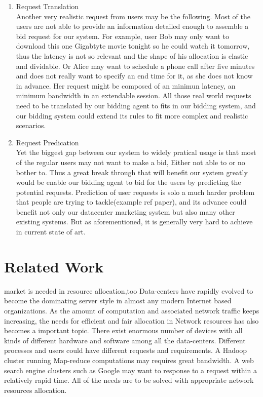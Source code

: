 \documentclass[a4paper,11pt,twocolumn]{article}
\begin{document}
\begin{enumerate}
\item  Request Translation\\
Another very realistic request from users may be the following. Most of the users are not able to provide an information detailed enough to assemble a bid request for our system. For example, user Bob may only want to download this one Gigabtyte movie tonight so he could watch it tomorrow, thus the latency is not so relevant and the shape of his allocation is elastic and dividable. Or Alice may want to schedule a phone call  after five minutes and does not really want to specify an end time for it, as she does not know in advance. Her request might be composed of an minimun latency, an minimum bandwidth in an extendable session. All those real world requests need to be translated by our bidding agent to fits in our bidding system, and our bidding system could extend its rules to fit more complex and realistic scenarios. 


\item Request Predication\\
Yet the biggest gap between our system to widely pratical usage is that most of the regular users may not want to make a bid, Either not able to or no bother to. Thus a great break through that will benefit our system greatly would be enable our bidding agent to bid for the users by predicting the potential requests.  Prediction of user requests is solo a much harder problem that people are trying to tackle(example ref paper), and its advance could benefit not only our datacenter marketing system but also many other existing systems. But as aforementioned, it is generally very hard to achieve in current state of art.

\end{enumerate}
 



\section{Related Work}
 market is needed in resource allocation,too
Data-centers have rapidly evolved to become the dominating server style in almost
any modern Internet based organizations. As the amount of computation and associated
network  traffic keeps increasing, the needs for efficient and fair  allocation in  Network resources
has also becomes a important topic. There exist enormous number of devices with all 
kinds of different hardware and software among all the data-centers. Different processes and users could
have different requests and requirements. A Hadoop cluster running Map-reduce computations 
may requires great bandwidth.
A web search engine clusters such as Google may want to response to a request 
within a relatively rapid time. All of the needs are to be solved with appropriate network resources
allocation.
\end{document}
